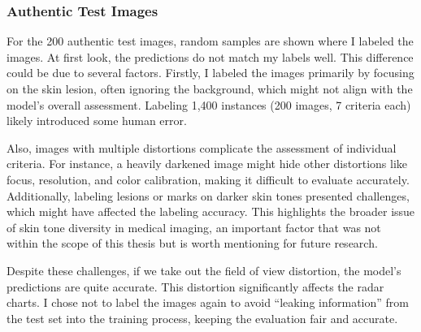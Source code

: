 \subsubsection{Authentic Test Images}
\label{subsubsec:AuthenticTestImages}
For the 200 authentic test images, random samples are shown where I labeled the images. At first look, the predictions do not match my labels well. This difference could be due to several factors. Firstly, I labeled the images primarily by focusing on the skin lesion, often ignoring the background, which might not align with the model’s overall assessment. Labeling 1,400 instances (200 images, 7 criteria each) likely introduced some human error. \par
\vspace{\baselineskip}
\noindent
Also, images with multiple distortions complicate the assessment of individual criteria. For instance, a heavily darkened image might hide other distortions like focus, resolution, and color calibration, making it difficult to evaluate accurately. Additionally, labeling lesions or marks on darker skin tones presented challenges, which might have affected the labeling accuracy. This highlights the broader issue of skin tone diversity in medical imaging, an important factor that was not within the scope of this thesis but is worth mentioning for future research.\par
\vspace{\baselineskip}
\noindent
Despite these challenges, if we take out the field of view distortion, the model’s predictions are quite accurate. This distortion significantly affects the radar charts. I chose not to label the images again to avoid “leaking information” from the test set into the training process, keeping the evaluation fair and accurate. \par

